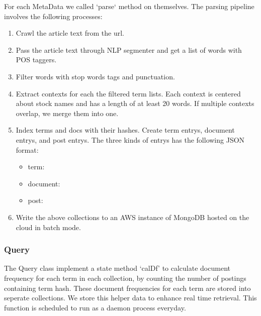 \documentclass{article}
\begin{document}
For each MetaData we called `parse` method on themselves. The parsing pipeline involves the following processes:
\begin{enumerate}
  \item Crawl the article text from the url.
  \item Pass the article text through NLP segmenter and get a list of words with POS taggers.
  \item Filter words with stop words tags and punctuation.
  \item Extract contexts for each the filtered term lists. Each context is centered about stock names and has a length of at least 20 words. If multiple contexts overlap, we merge them into one.
  \item Index terms and docs with their hashes. Create term entrys, document entrys, and post entrys. The three kinds of entrys has the following JSON format:
  \begin{itemize}
    \item term: \par
      \texttt{} \par
    \item document:\par
      \texttt{} \par
      \texttt{} \par
      \texttt{} \par
      \texttt{}\par
    \item post:\par
      \texttt{}\par
      \texttt{}
  \end{itemize}
  \item Write the above collections to an AWS instance of MongoDB hosted on the cloud in batch mode. 
\end{enumerate}

\subsubsection{Query}
The Query class implement a state method `calDf' to calculate document frequency for each term in each collection, by counting the number of postings containing term hash. These document frequencies for each term are stored into seperate collections. We store this helper data to enhance real time retrieval. This function is scheduled to run as a daemon process everyday.
\end{document}

